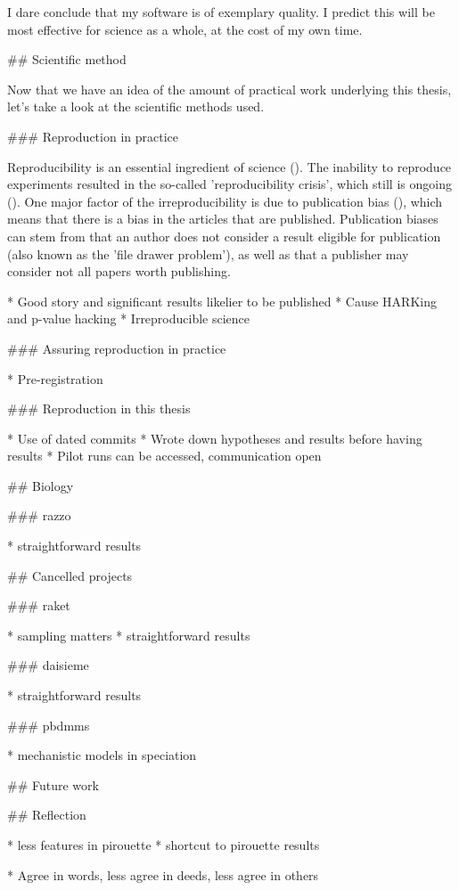 I dare conclude that my software is of exemplary quality. I predict this
will be most effective for science as a whole, at the cost of my own time.

## Scientific method

Now that we have an idea of the amount of practical work underlying
this thesis, let's take a look at the scientific methods used.

### Reproduction in practice

Reproducibility is an essential ingredient of science (\cite{mcnutt2014reproducibility}).
The inability to reproduce experiments resulted in the so-called 'reproducibility
crisis', which still is ongoing (\cite{schooler2014metascience}).
One major factor of the irreproducibility is due to publication
bias (\cite{nissen2016publication}), which means that there is a bias
in the articles that are published.
Publication biases can stem from that an author does not consider
a result eligible for publication (also known as the 'file drawer problem'),
as well as that a publisher may consider not all papers worth publishing.


 * Good story and significant results likelier to be published
 * Cause HARKing and p-value hacking
 * Irreproducible science

### Assuring reproduction in practice

 * Pre-registration

### Reproduction in this thesis

 * Use of dated commits
 * Wrote down hypotheses and results before having results
 * Pilot runs can be accessed, communication open

## Biology

### razzo

 * straightforward results

## Cancelled projects

### raket

 * sampling matters
 * straightforward results

### daisieme

 * straightforward results

### pbdmms

 * mechanistic models in speciation

## Future work

## Reflection

 * less features in pirouette
 * shortcut to pirouette results



 * Agree in words, less agree in deeds, less agree in others \cite{anderson2007normative}



